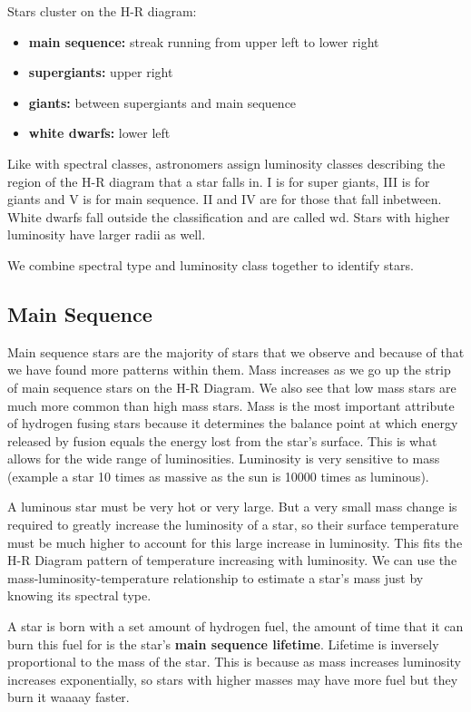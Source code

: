 \documentclass[12pt]{article}
\begin{document}
Stars cluster on the H-R diagram:
\begin{itemize}
\item \textbf{main sequence: }streak running from upper left to lower right
\item \textbf{supergiants: }upper right
\item \textbf{giants: }between supergiants and main sequence
\item \textbf{white dwarfs: }lower left
\end{itemize}

Like with spectral classes, astronomers assign luminosity classes describing the region of the H-R diagram that a star falls in. I is for super giants, III is for giants and V is for main sequence. II and IV are for those that fall inbetween. White dwarfs fall outside the classification and are called wd. Stars with higher luminosity have larger radii as well.

We combine spectral type and luminosity class together to identify stars.

\subsection{Main Sequence}
Main sequence stars are the majority of stars that we observe and because of that we have found more patterns within them. Mass increases as we go up the strip of main sequence stars on the H-R Diagram. We also see that low mass stars are much more common than high mass stars. Mass is the most important attribute of hydrogen fusing stars because it determines the balance point at which energy released by fusion equals the energy lost from the star's surface. This is what allows for the wide range of luminosities. Luminosity is very sensitive to mass (example a star 10 times as massive as the sun is 10000 times as luminous).

A luminous star must be very hot or very large. But a very small mass change is required to greatly increase the luminosity of a star, so their surface temperature must be much higher to account for this large increase in luminosity. This fits the H-R Diagram pattern of temperature increasing with luminosity. We can use the mass-luminosity-temperature relationship to estimate a star's mass just by knowing its spectral type.

A star is born with a set amount of hydrogen fuel, the amount of time that it can burn this fuel for is the star's \textbf{main sequence lifetime}. Lifetime is inversely proportional to the mass of the star. This is because as mass increases luminosity increases exponentially, so stars with higher masses may have more fuel but they burn it waaaay faster.
\end{document}
